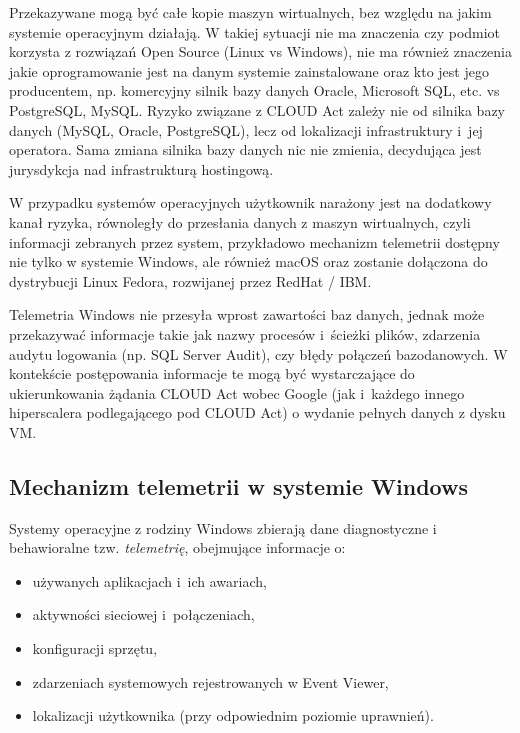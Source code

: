 Przekazywane mogą być całe kopie maszyn wirtualnych, bez względu na jakim systemie operacyjnym działają. W takiej sytuacji nie ma znaczenia czy podmiot korzysta z rozwiązań Open Source (Linux vs Windows), nie ma również znaczenia jakie oprogramowanie jest na danym systemie zainstalowane oraz kto jest jego producentem, np. komercyjny silnik bazy danych Oracle, Microsoft SQL, etc. vs PostgreSQL, MySQL. Ryzyko związane z CLOUD Act zależy nie od silnika bazy danych (MySQL, Oracle, PostgreSQL), lecz od lokalizacji infrastruktury i~jej operatora. Sama zmiana silnika bazy danych nic nie zmienia, decydująca jest jurysdykcja nad infrastrukturą hostingową.

W przypadku systemów operacyjnych użytkownik narażony jest na dodatkowy kanał ryzyka, równoległy do przesłania danych z maszyn wirtualnych, czyli informacji zebranych przez system, przykładowo mechanizm telemetrii dostępny nie tylko w systemie Windows\autocite{microsoft_telemetry_docs}, ale również macOS\autocite{apple_telemetry_privacy_guides} oraz zostanie dołączona do dystrybucji Linux Fedora\autocite{fedora_wiki_telemetry}, rozwijanej przez RedHat / IBM.

Telemetria Windows nie przesyła wprost zawartości baz danych, jednak może przekazywać informacje takie jak nazwy procesów i~ścieżki plików, zdarzenia audytu logowania (np. SQL Server Audit), czy błędy połączeń
bazodanowych. W kontekście postępowania informacje te mogą być wystarczające do ukierunkowania żądania CLOUD Act
wobec Google (jak i~każdego innego hiperscalera podlegającego pod CLOUD Act) o wydanie pełnych danych z dysku VM.

\subsection{Mechanizm telemetrii w systemie Windows}

Systemy operacyjne z rodziny Windows zbierają dane diagnostyczne
i behawioralne tzw. \textit{telemetrię},  obejmujące informacje o:
\begin{itemize}[noitemsep]
  \item używanych aplikacjach i~ich awariach,
  \item aktywności sieciowej i~połączeniach,
  \item konfiguracji sprzętu,
  \item zdarzeniach systemowych rejestrowanych w Event Viewer,
  \item lokalizacji użytkownika (przy odpowiednim poziomie uprawnień).
\end{itemize}

